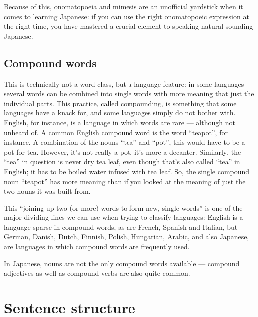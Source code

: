 \documentclass[11pt, b5paper, twoside, openright, onecolumn]{book}
\begin{document}
Because of this‚ onomatopoeia and mimesis are an unofficial yardstick when it comes to learning Japanese: if you can use the right onomatopoeic expression at the right time‚ you have mastered a crucial element to speaking natural sounding Japanese.

\subsection{Compound words}

This is technically not a word class‚ but a language feature: in some languages several words can be combined into single words with more meaning that just the individual parts. This practice‚ called compounding‚ is something that some languages have a knack for‚ and some languages simply do not bother with. English‚ for instance‚ is a language in which  words are rare — although not unheard of. A common English compound word is the word “teapot”‚ for instance. A combination of the nouns “tea” and “pot”‚ this would have to be a pot for tea. However‚ it’s not really a pot‚ it’s more a decanter. Similarly‚ the “tea” in question is never dry tea leaf‚ even though that’s also called “tea” in English; it has to be boiled water infused with tea leaf. So‚ the single compound noun “teapot” has more meaning than if you looked at the meaning of just the two nouns it was built from.

This “joining up two (or more) words to form new‚ single words” is one of the major dividing lines we can use when trying to classify languages: English is a language sparse in compound words‚ as are French‚ Spanish and Italian‚ but German‚ Danish‚ Dutch‚ Finnish‚ Polish‚ Hungarian‚ Arabic‚ and also Japanese‚ are languages in which compound words are frequently used.

In Japanese‚ nouns are not the only compound words available — compound adjectives as well as compound verbs are also quite common.

\section{Sentence structure}
\end{document}
